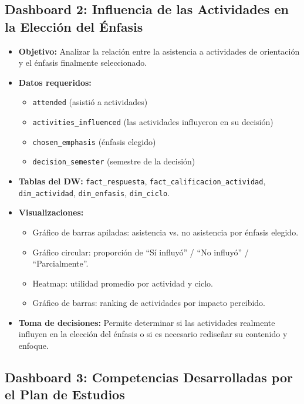\documentclass[12pt, letterpaper]{article}
\begin{document}
\subsection{Dashboard 2: Influencia de las Actividades en la Elección del Énfasis}

\begin{itemize}
  \item \textbf{Objetivo:} Analizar la relación entre la asistencia a actividades de orientación y el énfasis finalmente seleccionado.
  \item \textbf{Datos requeridos:}
  \begin{itemize}
    \item \texttt{attended} (asistió a actividades)
    \item \texttt{activities\_influenced} (las actividades influyeron en su decisión)
    \item \texttt{chosen\_emphasis} (énfasis elegido)
    \item \texttt{decision\_semester} (semestre de la decisión)
  \end{itemize}
  \item \textbf{Tablas del DW:} \texttt{fact\_respuesta}, \texttt{fact\_calificacion\_actividad}, \texttt{dim\_actividad}, \texttt{dim\_enfasis}, \texttt{dim\_ciclo}.
  \item \textbf{Visualizaciones:}
  \begin{itemize}
    \item Gráfico de barras apiladas: asistencia vs. no asistencia por énfasis elegido.
    \item Gráfico circular: proporción de ``Sí influyó'' / ``No influyó'' / ``Parcialmente''.
    \item Heatmap: utilidad promedio por actividad y ciclo.
    \item Gráfico de barras: ranking de actividades por impacto percibido.
  \end{itemize}
  \item \textbf{Toma de decisiones:} Permite determinar si las actividades realmente influyen en la elección del énfasis o si es necesario rediseñar su contenido y enfoque.
\end{itemize}

\subsection{Dashboard 3: Competencias Desarrolladas por el Plan de Estudios}
\end{document}
